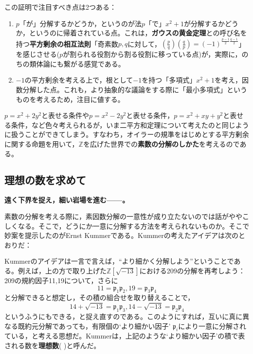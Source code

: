 この証明で注目すべき点は2つある：

\begin{enumerate}
    \item $p$「が」分解するかどうか，というのが法$p$「で」$x^2+1$が分解するかどうか，というのに帰着されている点。これは，\textbf{ガウスの黄金定理}との呼び名を持つ\textbf{平方剰余の相互法則}「奇素数$p, q$に対して，$\left(\frac{p}{q}\right)\left(\frac{q}{p}\right)=(-1)^{\frac{p-1}{2}\frac{q-1}{2}}$」を感じさせる($p$が割られる役割から割る役割に移っている点)が，実際に，のちの類体論にも繋がる感覚である。
    \item $-1$の平方剰余を考える上で，根として$-1$を持つ「多項式」$x^2+1$を考え，因数分解した点。これも，より抽象的な議論をする際に「最小多項式」というものを考えるため，注目に値する。
\end{enumerate}

$p=x^2+2y^2$と表せる条件や$p=x^2-2y^2$と表せる条件，$p=x^2+xy+y^2$と表せる条件，など色々考えられるが，いま二平方和定理について考えたのと同じように扱うことができてしまう。すなわち，オイラーの規準をはじめとする平方剰余に関する命題を用いて，$\mathds{Z}$を広げた世界での\textbf{素数の分解のしかた}を考えるのである。

\subsection{理想の数を求めて}
\textbf{遠く下界を捉え，細い岩場を進む------。}

\vspace{10pt}

素数の分解を考える際に，素因数分解の一意性が成り立たないのでは話がややこしくなる。そこで，どうにか一意に分解する方法を考えられないものか。そこで妙案を提示したのがErnst Kummerである。Kummerの考えたアイデアは次のとおりだ：

\begin{mybox}[クンマーのIdea]
    Kummerのアイデアは一言で言えば，``より細かく分解しよう''ということである。例えば，上の方で取り上げた$\mathds{Z}[\sqrt{-13}]$における209の分解を再考しよう：209の規約因子11,19について，さらに\[
    11=\mathfrak{p}_1\mathfrak{p}_2, 19=\mathfrak{p}_3\mathfrak{p}_4
    \]と分解できると想定し，その積の組合せを取り替えることで，\[
    14+\sqrt{-13}=\mathfrak{p}_1\mathfrak{p}_3, 14-\sqrt{-13}=\mathfrak{p}_2\mathfrak{p}_4
    \]というふうにもできる，と捉え直すのである。このようにすれば，互いに真に異なる既約元分解であっても，有限個の`より細かい因子' $\mathfrak{p}_i$により一意に分解されている，と考える思想だ。Kummerは，上記のような`より細かい因子'の積で表される数を\textbf{理想数}( )と呼んだ。
\end{mybox}

